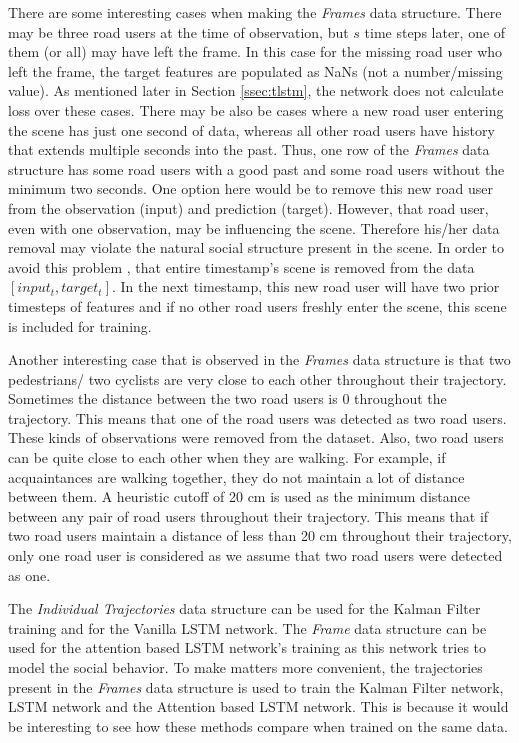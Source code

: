 \documentclass{article}
\begin{document}
There are some interesting cases when making the \textit{Frames} data structure. There may be three road users at the time of observation, but $s$ time steps later, one of them (or all) may have left the frame. In this case for the missing road user who left the frame, the target features are populated as NaNs (not a number/missing value). As mentioned later in Section \ref{ssec:tlstm}, the network does not calculate loss over these cases. There may be also be cases where a new road user entering the scene has just one second of data, whereas all other road users have history that extends multiple seconds into the past. Thus, one row of the \textit{Frames} data structure has some road users with a good past and some road users without the minimum two seconds.  One option here would be to remove this new road user from the observation (input) and prediction (target). However, that road user, even with one observation, may be influencing the scene. Therefore his/her data removal may violate the natural social structure present in the scene. In order to avoid this problem , that entire timestamp's scene is removed from the data $[input_t,target_t]$. In the next timestamp, this new road user will have two prior timesteps of features and if no other road users freshly enter the scene, this scene is included for training. 

Another interesting case that is observed in the \textit{Frames} data structure is that two pedestrians/ two cyclists are very close to each other throughout their trajectory. Sometimes the distance between the two road users is 0 throughout the trajectory. This means that one of the road users was detected as two road users. These kinds of observations were removed from the dataset. Also, two road users can be quite close to each other when they are walking. For example, if acquaintances are walking together, they do not maintain a lot of distance between them. A heuristic cutoff of 20 cm is used as the minimum distance between any pair of road users throughout their trajectory. This means that if two road users maintain a distance of less than 20 cm throughout their trajectory, only one road user is considered as we assume that two road users were detected as one. 


 The \textit{Individual Trajectories} data structure can be used for the Kalman Filter training and for the Vanilla LSTM network. The \textit{Frame} data structure can be used for the attention based LSTM network's training as this network tries to model the social behavior. To make matters more convenient, the trajectories present in the \textit{Frames} data structure is used to train the Kalman Filter network, LSTM network and the Attention based LSTM network. This is because it would be interesting to see how these methods compare when trained on the same data.
\end{document}
